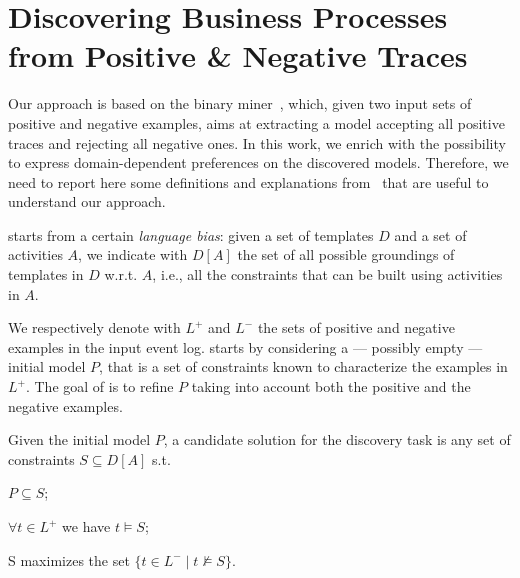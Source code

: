 
\section{Discovering Business Processes from Positive \& Negative Traces}
\label{sec:deviant}




Our approach is based on the \nd binary miner~\cite{deviant-tkde}, which, given two input sets of positive and negative examples, aims at extracting a model accepting all positive traces and rejecting all negative ones. %
In this work, we enrich \nd with the possibility to express domain-dependent preferences on the discovered models. Therefore, we need to report here some definitions and explanations from~\cite{deviant-tkde} that are useful to understand %
our approach.

\nd starts from a certain \emph{language bias}: given a set of \declare templates $D$ and a set of activities $A$, we indicate with $D[A]$ the set of all possible groundings of templates in $D$ w.r.t. $A$, i.e., all the constraints that can be built using activities in $A$.

We respectively denote with $L^+$ and $L^-$ the sets of positive and negative examples %
in the input event log. \nd starts by considering a --- possibly empty --- initial model $P$, that is a set of \declare constraints known to characterize the examples in $L^+$. The goal of \nd is to refine $P$ taking into account both the positive and the negative examples.

\begin{definition}{}\label{def:cand}
Given the initial model $P$, a candidate solution for the discovery task is any set of constraints $S\subseteq D[A]$ s.t.
\begin{enumerate*} [label=\textit{(\roman*)}]
  \item $P\subseteq S$;
  \item $\forall t\in L^+$ we have $t\models S$;
  \item S maximizes the set $\{t\in L^-\mid t\not\models S\}$.
\end{enumerate*}
\end{definition}

